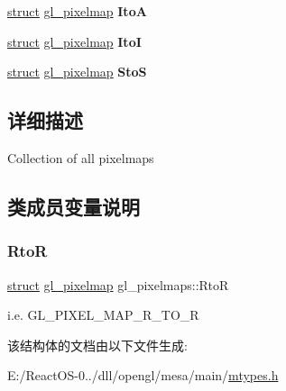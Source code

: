 \begin{DoxyCompactItemize}
\item 
\mbox{\label{structgl__pixelmaps_abb963892922085afbd4226cdccadd5d4}} 
\hyperlink{interfacestruct}{struct} \hyperlink{structgl__pixelmap}{gl\+\_\+pixelmap} {\bfseries ItoA}
\item 
\mbox{\label{structgl__pixelmaps_a8aae2c82172e14c50d01ff2a38ed6c4d}} 
\hyperlink{interfacestruct}{struct} \hyperlink{structgl__pixelmap}{gl\+\_\+pixelmap} {\bfseries ItoI}
\item 
\mbox{\label{structgl__pixelmaps_aca7adb50a1d025fec9f8488ddf70d3a5}} 
\hyperlink{interfacestruct}{struct} \hyperlink{structgl__pixelmap}{gl\+\_\+pixelmap} {\bfseries StoS}
\end{DoxyCompactItemize}


\subsection{详细描述}
Collection of all pixelmaps 

\subsection{类成员变量说明}
\mbox{\label{structgl__pixelmaps_ab4f675948ee15565b74fd10f3e8c18d4}} 
\subsubsection{\texorpdfstring{RtoR}{RtoR}}
{\footnotesize\ttfamily \hyperlink{interfacestruct}{struct} \hyperlink{structgl__pixelmap}{gl\+\_\+pixelmap} gl\+\_\+pixelmaps\+::\+RtoR}

i.\+e. G\+L\+\_\+\+P\+I\+X\+E\+L\+\_\+\+M\+A\+P\+\_\+\+R\+\_\+\+T\+O\+\_\+R 

该结构体的文档由以下文件生成\+:\begin{DoxyCompactItemize}
\item 
E\+:/\+React\+O\+S-\/0../dll/opengl/mesa/main/\hyperlink{mtypes_8h}{mtypes.\+h}\end{DoxyCompactItemize}

